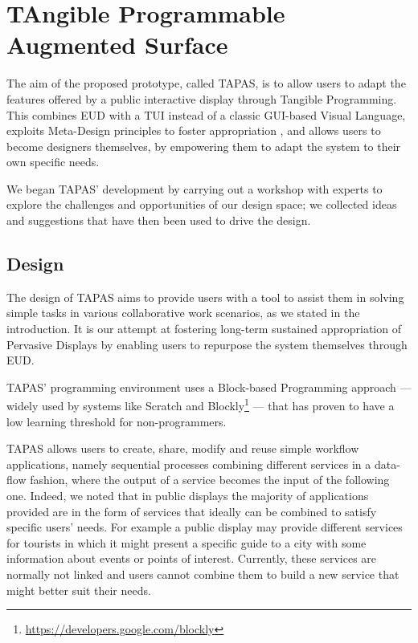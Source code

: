 \section{TAngible Programmable Augmented Surface}
The aim of the proposed prototype, called \ac{TAPAS}, is to allow users to adapt the features offered by a public interactive display through Tangible Programming. This combines \ac{EUD} with a \ac{TUI} instead of a classic \acs{GUI}-based Visual Language, exploits Meta-Design principles to foster appropriation \cite{Ardito:2014ci}, and allows users to become designers themselves, by empowering them to adapt the system to their own specific needs.

We began \ac{TAPAS}' development by carrying out a workshop with experts to explore the challenges and opportunities of our design space; we collected ideas and suggestions that have then been used to drive the design.

\subsection{Design}
The design of \ac{TAPAS} aims to provide users with a tool to assist them in solving simple tasks in various collaborative work scenarios, as we stated in the introduction. It is our attempt at fostering long-term sustained appropriation of Pervasive Displays by enabling users to repurpose the system themselves through \ac{EUD}.

\ac{TAPAS}' programming environment uses a Block-based Programming approach \cite{Mohamad:2011kz} --- widely used by systems like Scratch \cite{Resnick:2009bd} and Blockly\footnote{\url{https://developers.google.com/blockly}} --- that has proven to have a low learning threshold for non-programmers.

\acs{TAPAS} allows users to create, share, modify and reuse simple workflow applications, namely sequential processes combining different services in a data-flow fashion, where the output of a service becomes the input of the following one. Indeed, we noted that in public displays the majority of applications provided are in the form of services that ideally can be combined to satisfy specific users' needs. For example a public display may provide different services for tourists in which it might present a specific guide to a city with some information about events or points of interest. Currently, these services are normally not linked and users cannot combine them to build a new service that might better suit their needs.

